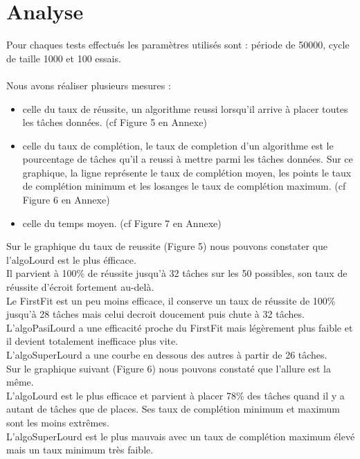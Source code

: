 \documentclass[11pt]{article}
\begin{document}
\section{Analyse}
Pour chaques tests effectués les paramètres utilisés sont : période de 50000, cycle de taille 1000 et 100 essais.\\
\\
Nous avons réaliser plusieurs mesures :
\begin{itemize}
    \item celle du taux de réussite, un algorithme reussi lorsqu'il arrive à placer toutes les tâches données. (cf Figure 5 en Annexe)
    \item celle du taux de complétion, le taux de completion d'un algorithme est le pourcentage de tâches qu'il a reussi à mettre parmi les tâches données. Sur ce graphique, la ligne représente le taux de complétion moyen, les points le taux de complétion minimum et les losanges le taux de complétion maximum. (cf Figure 6 en Annexe)
    \item celle du temps moyen. (cf Figure 7 en Annexe)\\
\end{itemize}

 Sur le graphique du taux de reussite (Figure 5) nous pouvons constater que l'algoLourd est le plus éfficace.\\
 Il parvient à 100\% de réussite jusqu'à 32 tâches sur les 50 possibles, son taux de réussite d'écroit fortement au-delà.\\
 Le FirstFit est un peu moins efficace, il conserve un taux de réussite de 100\% jusqu'à 28 tâches mais celui decroit doucement puis chute à 32 tâches.\\
 L'algoPasiLourd a une efficacité proche du FirstFit mais légèrement plus faible et il devient totalement inefficace plus vite.\\
 L'algoSuperLourd a une courbe en dessous des autres à partir de 26 tâches.\\

 Sur le graphique suivant (Figure 6) nous pouvons constaté que l'allure est la même.\\
L'algoLourd est le plus efficace et parvient à placer 78\% des tâches quand il y a autant de tâches que de places. Ses taux de complétion minimum et maximum sont les moins extrêmes.\\ 
L'algoSuperLourd est le plus mauvais avec un taux de complétion maximum élevé mais un taux minimum très faible.\\
\end{document}
